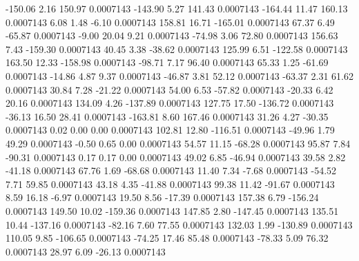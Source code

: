      -150.06        2.16      150.97     0.0007143
     -143.90        5.27      141.43     0.0007143
     -164.44       11.47      160.13     0.0007143
        6.08        1.48       -6.10     0.0007143
      158.81       16.71     -165.01     0.0007143
       67.37        6.49      -65.87     0.0007143
       -9.00       20.04        9.21     0.0007143
      -74.98        3.06       72.80     0.0007143
      156.63        7.43     -159.30     0.0007143
       40.45        3.38      -38.62     0.0007143
      125.99        6.51     -122.58     0.0007143
      163.50       12.33     -158.98     0.0007143
      -98.71        7.17       96.40     0.0007143
       65.33        1.25      -61.69     0.0007143
      -14.86        4.87        9.37     0.0007143
      -46.87        3.81       52.12     0.0007143
      -63.37        2.31       61.62     0.0007143
       30.84        7.28      -21.22     0.0007143
       54.00        6.53      -57.82     0.0007143
      -20.33        6.42       20.16     0.0007143
      134.09        4.26     -137.89     0.0007143
      127.75       17.50     -136.72     0.0007143
      -36.13       16.50       28.41     0.0007143
     -163.81        8.60      167.46     0.0007143
       31.26        4.27      -30.35     0.0007143
        0.02        0.00        0.00     0.0007143
      102.81       12.80     -116.51     0.0007143
      -49.96        1.79       49.29     0.0007143
       -0.50        0.65        0.00     0.0007143
       54.57       11.15      -68.28     0.0007143
       95.87        7.84      -90.31     0.0007143
        0.17        0.17        0.00     0.0007143
       49.02        6.85      -46.94     0.0007143
       39.58        2.82      -41.18     0.0007143
       67.76        1.69      -68.68     0.0007143
       11.40        7.34       -7.68     0.0007143
      -54.52        7.71       59.85     0.0007143
       43.18        4.35      -41.88     0.0007143
       99.38       11.42      -91.67     0.0007143
        8.59       16.18       -6.97     0.0007143
       19.50        8.56      -17.39     0.0007143
      157.38        6.79     -156.24     0.0007143
      149.50       10.02     -159.36     0.0007143
      147.85        2.80     -147.45     0.0007143
      135.51       10.44     -137.16     0.0007143
      -82.16        7.60       77.55     0.0007143
      132.03        1.99     -130.89     0.0007143
      110.05        9.85     -106.65     0.0007143
      -74.25       17.46       85.48     0.0007143
      -78.33        5.09       76.32     0.0007143
       28.97        6.09      -26.13     0.0007143
